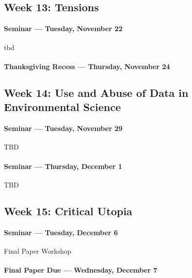     \subsection{\textbf{Week 13}: Tensions}
    
    \paragraph{Seminar --- Tuesday, November 22}
    
    \begin{itemize*}
    \item tbd
    \end{itemize*}
    
    
    \paragraph{Thanksgiving Recess --- Thursday, November 24}
    
    \subsection{\textbf{Week 14}: Use and Abuse of Data in Environmental Science}
    
    \paragraph{Seminar --- Tuesday, November 29}
    
    \begin{itemize*}
    \item TBD
    \end{itemize*}	
    

    \paragraph{Seminar --- Thursday, December 1}
    
    \begin{itemize*}
    \item TBD
    \end{itemize*}
    
    \subsection{\textbf{Week 15}: Critical Utopia}
    
    \paragraph{Seminar --- Tuesday, December 6}
\begin{itemize*}
  \item Final Paper Workshop
\end{itemize*}

    \paragraph{Final Paper Due --- Wednesday, December 7}   
   